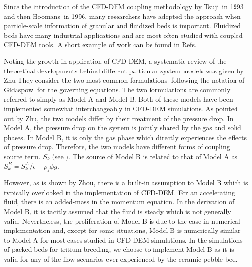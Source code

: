 Since the introduction of the CFD-DEM coupling methodology by Tsuji\etal~in 1993 and then Hoomans\etal~in 1996, many researchers have adopted the approach when particle-scale information of granular and fluidized beds is important.\cite{Tsuji1993,Hoomans1996} Fluidized beds have many industrial applications and are most often studied with coupled CFD-DEM tools. A short example of work can be found in Refs.~\cite{Xu1997,Patankar2001,Swasdisevi2005,Deen2007,Zhang2008,Chu2008,VanBuijtenen2011,Gruber2012,Peng2014}

Noting the growth in application of CFD-DEM, a systematic review of the theoretical developments behind different particular system models was given by Zhu\etal\cite{Zhu2007} They consider the two most common formulations, following the notation of Gidaspow, for the governing equations. The two formulations are commonly referred to simply as Model A and Model B.\cite{gidaspow1994multiphase} Both of these models have been implemented somewhat interchangeably in CFD-DEM simulations. As pointed out by Zhu\etal, the two models differ by their treatment of the pressure drop. In Model A, the pressure drop on the system is jointly shared by the gas and solid phases. In Model B, it is only the gas phase which directly experiences the effects of pressure drop. Therefore, the two models have different forms of coupling source term, $S_k$ (see ). The source of Model B is related to that of Model A as $S_k^B = S_k^A/\epsilon - \rho_f\phi g$.

However, as is shown by Zhou\etal, there is a built-in assumption to Model B which is typically overlooked in the implementation of CFD-DEM. For an accelerating fluid, there is an added-mass in the momentum equation. In the derivation of Model B, it is tacitly assumed that the fluid is steady which is not generally valid.\cite{Zhou2010} Nevertheless, the proliferation of Model B is due to the ease in numerical implementation and, except for some situations, Model B is numerically similar to Model A for most cases studied in CFD-DEM simulations.\cite{Zhou2010} In the simulations of packed beds for tritium breeding, we choose to implement Model B as it is valid for any of the flow scenarios ever experienced by the ceramic pebble bed.








